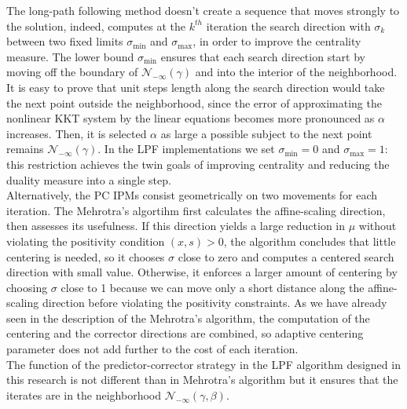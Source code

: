 \documentclass[a4paper,10 pt,titlepage,twoside]{book}
\theoremstyle{plain}
\theoremstyle{definition}
\theoremstyle{remark}
\begin{document}
{{The long-path following method doesn't create a sequence that moves strongly to the solution, indeed, computes at the $k^{th}$ iteration the search direction with $\sigma_{k}$ between two fixed limits $\sigma_{\text{min}}$ and $\sigma_{\text{max}}$, in order to improve the centrality measure. The lower bound $\sigma_{\text{min}}$ ensures that each search direction start by moving off the boundary of $\mathcal{N}_{-\infty}(\gamma)$ and into the interior of the neighborhood. It is easy to prove that unit steps length along the search direction would take the next point outside the neighborhood, since the error of approximating the nonlinear KKT system by the linear equations becomes more pronounced as $\alpha$ increases. Then, it is selected $\alpha$ as large a possible subject to the next point remains $\mathcal{N}_{-\infty}(\gamma)$. In the LPF implementations we set $\sigma_{\text{min}}=0$ and $\sigma_{\text{max}}=1$: this restriction achieves the twin goals of improving centrality and reducing the duality measure into a single step.\\
Alternatively, the PC IPMs consist geometrically on two movements for each iteration. 
The Mehrotra's algortihm first calculates the affine-scaling direction, then assesses its usefulness. If this direction yields a large reduction in $\mu$ without violating the positivity condition $(x, s)> 0$, the algorithm concludes that little centering is needed, so it chooses $\sigma$ close to zero and computes a centered search direction with small value. Otherwise, it enforces a larger amount of centering by choosing $\sigma$ close to 1 because we can move only a short distance along the affine-scaling direction before violating the positivity constraints. As we have already seen in the description of the Mehrotra's algorithm, the computation of the centering and the corrector directions are combined, so adaptive centering parameter does not add further to the cost of each iteration. \\
The function of the predictor-corrector strategy in the LPF algorithm designed in this research is not different than in Mehrotra's algorithm but it ensures that the iterates are in the neighborhood $\mathcal{N}_{-\infty}(\gamma, \beta)$.

}}
\end{document}
